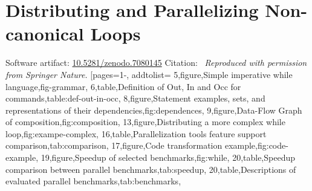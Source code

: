 \chapter{Distributing and Parallelizing Non-canonical Loops}
\label{app:sec:vmcai}
{\noindent Software artifact: \href{https://zenodo.org/records/7080145}{10.5281/zenodo.7080145}
\newline\noindent Citation:~\cite{aubert202213}
\newline\newline\textit{Reproduced with permission from Springer Nature.}}
[pages={1-}, addtolist={
5,figure,{Simple imperative while language},fig-grammar,
6,table,{Definition of Out, In and Occ for commands},table:def-out-in-occ,
8,figure,{Statement examples, sets, and representations of their dependencies},fig:dependences,
9,figure,Data-Flow Graph of composition,fig:composition,
13,figure,Distributing a more complex while loop,fig:exampe-complex,
16,table,Parallelization tools feature support comparison,tab:comparison,
17,figure,Code transformation example,fig:code-example,
19,figure,Speedup of selected benchmarks,fig:while,
20,table,Speedup comparison between parallel benchmarks,tab:speedup,
20,table,Descriptions of evaluated parallel benchmarks,tab:benchmarks},
